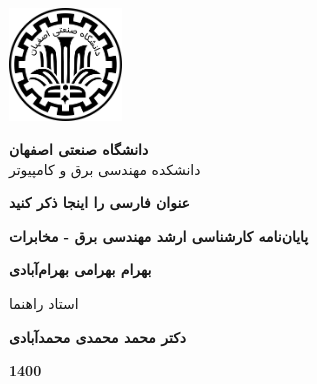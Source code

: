 \thispagestyle{empty}
\begin{center}
\includegraphics[height=3cm]{images/iut_logo.png}
\vspace{0.4cm}

{\large
	\textbf{دانشگاه صنعتی اصفهان}\\
	دانشکده مهندسی برق و کامپیوتر
}
\vspace{3cm}

{\LARGE
	\textbf{
		عنوان فارسی را اینجا ذکر کنید }\\
}
\vspace{3cm}

{\large
	\textbf{پایان‌نامه کارشناسی ارشد مهندسی برق - مخابرات}\\
}
\vspace{1cm}

{\Large
	\textbf{بهرام بهرامی بهرام‌آبادی}\\
}
\vspace{2.5cm}

{\large
	استاد راهنما\\
}
\vspace{0.5cm}

{\Large
	\textbf{دکتر محمد محمدی محمدآبادی}\\
}
\vspace{1cm}

\vspace{0.5cm}

\vspace{3.75cm}

{\Large
	\textbf{1400}
}

\end{center}
\restoregeometry
\pagebreak

